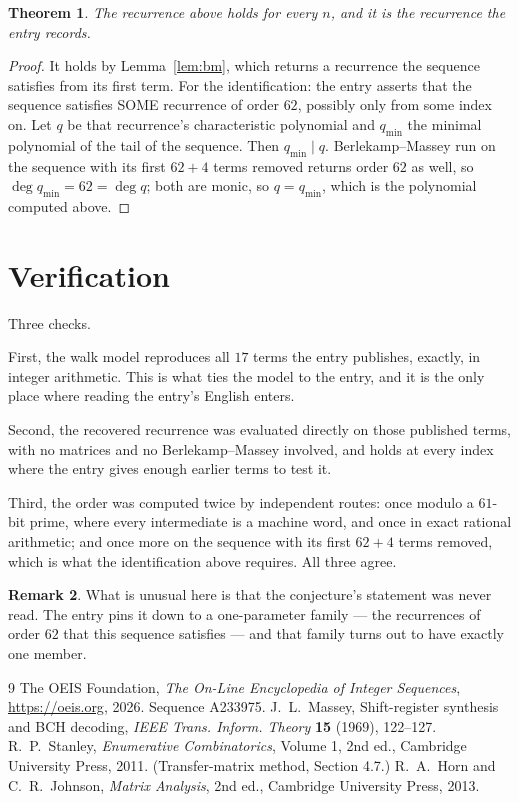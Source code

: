\documentclass[11pt,a4paper]{article}
\theoremstyle{plain}
\newtheorem{theorem}{Theorem}
\theoremstyle{definition}
\newtheorem{remark}[theorem]{Remark}
\begin{document}
\begin{theorem}
The recurrence above holds for every $n$, and it is the recurrence the entry records.
\end{theorem}

\begin{proof}
It holds by Lemma~\ref{lem:bm}, which returns a recurrence the sequence satisfies from its
first term. For the identification: the entry asserts that the sequence satisfies SOME
recurrence of order $62$, possibly only from some index on. Let $q$ be that recurrence's
characteristic polynomial and $q_{\min}$ the minimal polynomial of the tail of the sequence.
Then $q_{\min}\mid q$. Berlekamp--Massey run on the sequence with its first $62+4$ terms
removed returns order $62$ as well, so $\deg q_{\min}=62=\deg q$; both are monic, so
$q=q_{\min}$, which is the polynomial computed above.
\end{proof}

\section{Verification}

Three checks.

First, the walk model reproduces all $17$ terms the entry publishes, exactly, in integer
arithmetic. This is what ties the model to the entry, and it is the only place where reading
the entry's English enters.

Second, the recovered recurrence was evaluated directly on those published terms, with no
matrices and no Berlekamp--Massey involved, and holds at every index where the entry gives
enough earlier terms to test it.

Third, the order was computed twice by independent routes: once modulo a $61$-bit prime, where
every intermediate is a machine word, and once in exact rational arithmetic; and once more on
the sequence with its first $62+4$ terms removed, which is what the identification above
requires. All three agree.

\begin{remark}
What is unusual here is that the conjecture's statement was never read. The entry pins it down
to a one-parameter family --- the recurrences of order $62$ that this sequence satisfies
--- and that family turns out to have exactly one member.
\end{remark}

\begin{thebibliography}{9}
 The OEIS Foundation, \emph{The On-Line Encyclopedia of Integer
Sequences}, \url{https://oeis.org}, 2026. Sequence A233975.
 J.~L.~Massey, Shift-register synthesis and BCH decoding, \emph{IEEE
Trans. Inform. Theory} \textbf{15} (1969), 122--127.
 R.~P.~Stanley, \emph{Enumerative Combinatorics}, Volume 1, 2nd ed.,
Cambridge University Press, 2011. (Transfer-matrix method, Section 4.7.)
 R.~A.~Horn and C.~R.~Johnson, \emph{Matrix Analysis}, 2nd ed., Cambridge
University Press, 2013.
\end{thebibliography}
\end{document}
